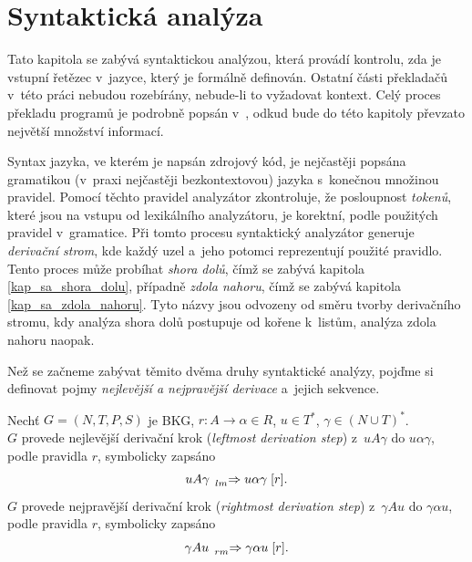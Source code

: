 \chapter{Syntaktická analýza}\label{kap_teorie_sa}
Tato kapitola se zabývá syntaktickou analýzou, která provádí kontrolu, zda je vstupní řetězec v~jazyce, který je formálně definován.
Ostatní části překladačů v~této práci nebudou rozebírány, nebude-li to vyžadovat kontext.
Celý proces překladu programů je podrobně popsán v~\cite{medunaElementsOfCompDesign}, odkud bude do této kapitoly převzato největší množství informací.

Syntax jazyka, ve kterém je napsán zdrojový kód, je nejčastěji popsána gramatikou (v~praxi nejčastěji bezkontextovou) jazyka s~konečnou množinou pravidel.
Pomocí těchto pravidel analyzátor zkontroluje, že posloupnost \emph{tokenů}, které jsou na vstupu od lexikálního analyzátoru, je korektní, podle použitých pravidel v~gramatice.
Při tomto procesu syntaktický analyzátor generuje \emph{derivační strom}, kde každý uzel a~jeho potomci reprezentují použité pravidlo.
Tento proces může probíhat \emph{shora dolů}, čímž se zabývá kapitola \ref{kap_sa_shora_dolu}, případně \emph{zdola nahoru}, čímž se zabývá kapitola \ref{kap_sa_zdola_nahoru}.
Tyto názvy jsou odvozeny od směru tvorby derivačního stromu, kdy analýza shora dolů postupuje od kořene k~listům, analýza zdola nahoru naopak.

Než se začneme zabývat těmito dvěma druhy syntaktické analýzy, pojďme si definovat pojmy \emph{nejlevější a nejpravější derivace} a~jejich sekvence.
\begin{definition}\label{def_nejlevejsi_nejpravejsi_der}
     Nechť $G = (N, T, P, S)$ je BKG, $r: A \rightarrow \alpha \in R$, $u \in T^*$, $\gamma \in (N \cup T)^*$. \\ 
     $G$ provede nejlevější derivační krok (\emph{leftmost derivation step}) z~$uA\gamma$ do $u\alpha\gamma$, podle pravidla $r$, symbolicky zapsáno
    \begin{equation*}
        uA\gamma\; \prescript{}{\scriptstyle lm}{\Rightarrow}\; u\alpha\gamma \; [r].
    \end{equation*}
    $G$ provede nejpravější derivační krok (\emph{rightmost derivation step}) z~$\gamma Au$ do $\gamma \alpha u$, podle pravidla $r$, symbolicky zapsáno
    \begin{equation*}
        \gamma Au\; \prescript{}{\scriptstyle rm}{\Rightarrow}\; \gamma \alpha u\; [r].
    \end{equation*}
\end{definition}

